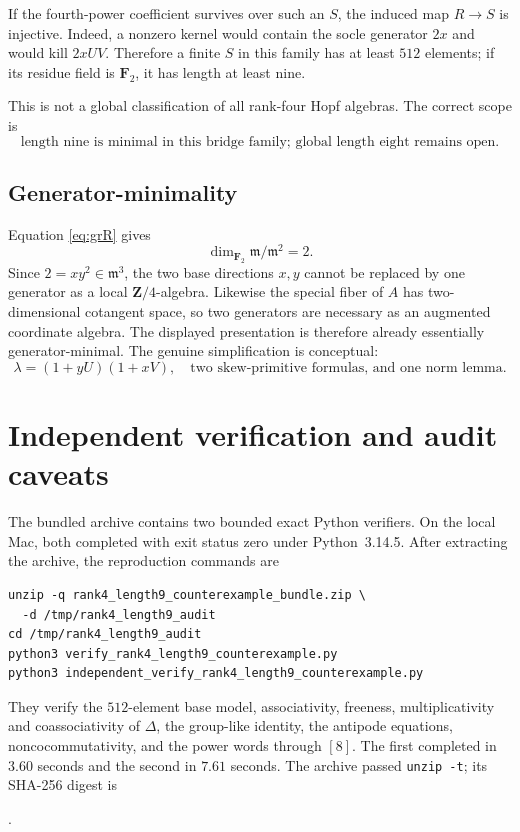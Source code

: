 \documentclass[11pt]{article}
\theoremstyle{remark}
\newcommand{\Z}{\mathbf Z}
\newcommand{\F}{\mathbf F}
\newcommand{\m}{\mathfrak m}
\begin{document}
If the fourth-power coefficient survives over such an $S$, the induced map
$R\to S$ is injective.  Indeed, a nonzero kernel would contain the socle
generator $2x$ and would kill $2xUV$.  Therefore a finite $S$ in this
family has at least $512$ elements; if its residue field is $\F_2$, it has
length at least nine.

This is not a global classification of all rank-four Hopf algebras.  The
correct scope is
\[
 \boxed{\text{length nine is minimal in this bridge family; global length
 eight remains open.}}
\]

\subsection{Generator-minimality}

Equation \eqref{eq:grR} gives
\[
 \dim_{\F_2}\m/\m^2=2.
\]
Since $2=xy^2\in\m^3$, the two base directions $x,y$ cannot be replaced by
one generator as a local $\Z/4$-algebra.  Likewise the special fiber of $A$
has two-dimensional cotangent space, so two generators are necessary as an
augmented coordinate algebra.
The displayed presentation is therefore already essentially
generator-minimal.  The genuine simplification is conceptual:
\[
 \lambda=(1+yU)(1+xV),
 \quad\text{two skew-primitive formulas, and one norm lemma.}
\]

\section{Independent verification and audit caveats}

The bundled archive  contains
two bounded exact Python verifiers.  On the local Mac, both completed with
exit status zero under Python~3.14.5.  After extracting the archive, the
reproduction commands are
\begin{verbatim}
unzip -q rank4_length9_counterexample_bundle.zip \
  -d /tmp/rank4_length9_audit
cd /tmp/rank4_length9_audit
python3 verify_rank4_length9_counterexample.py
python3 independent_verify_rank4_length9_counterexample.py
\end{verbatim}
They verify the $512$-element base model, associativity, freeness,
multiplicativity and coassociativity of $\Delta$, the group-like identity,
the antipode equations, noncocommutativity, and the power words through
$[8]$.  The first completed in $3.60$ seconds and the second in $7.61$
seconds.  The archive passed \texttt{unzip -t}; its SHA-256 digest is
\begin{center}
\small{}.
\end{center}
\end{document}
